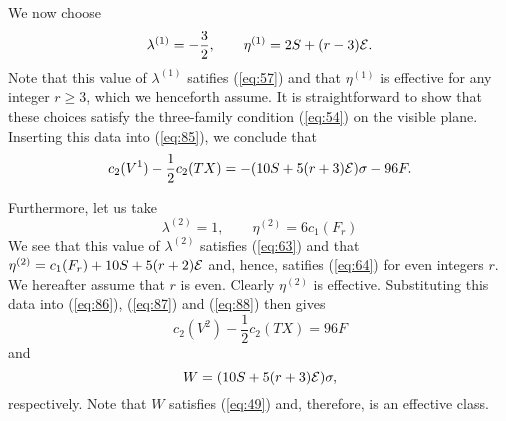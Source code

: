 \documentclass[a4paper,12pt]{article}
\numberwithin{equation}{section}
\theoremstyle{plain}
\begin{document}
We now choose
%
\begin{equation}
\lambda^{(1)}=-\frac{3}{2}, \qquad \eta^{(1)}=2S+(r-3){\cal{E}}.
\label{eq:90}
\end{equation}
%
Note that this value of $\lambda^{(1)}$ satifies (\ref{eq:57}) and that
$\eta^{(1)}$ is effective for any integer $r\geq3$, which we 
henceforth assume. It is straightforward to
show that these choices satisfy the three-family condition (\ref{eq:54}) on
the visible plane. Inserting this data into (\ref{eq:85}), we conclude that
%
\begin{equation}
c_{2}(V^{1})-\frac{1}{2}c_{2}(TX)=-(10S+5(r+3){\cal{E}})\sigma-96F.
\label{eq:91}
\end{equation}
%


Furthermore, let us take
%
\begin{equation}
\lambda^{(2)}=1, \qquad \eta^{(2)}=6c_{1}(F_{r})
\label{eq:92}
\end{equation}
%
We see that this value of $\lambda^{(2)}$ satisfies (\ref{eq:63}) and that
$\eta^{(2)}=c_{1}(F_{r})+10S+5(r+2){\cal{E}}$ and, hence, satifies
(\ref{eq:64}) for even integers $r$. We hereafter assume that $r$ is even. 
Clearly $\eta^{(2)}$ is effective. Substituting this
data into (\ref{eq:86}), (\ref{eq:87}) and (\ref{eq:88}) then gives
%
\begin{equation}
c_{2}(V^{2})-\frac{1}{2}c_{2}(TX)=96F
\label{eq:93}
\end{equation}
%
and
%
\begin{equation}
W=(10S+5(r+3){\cal{E}})\sigma,
\label{eq:94}
\end{equation}
%
respectively. Note that $W$ satisfies (\ref{eq:49}) and, therefore, is an
effective class.
\end{document}
